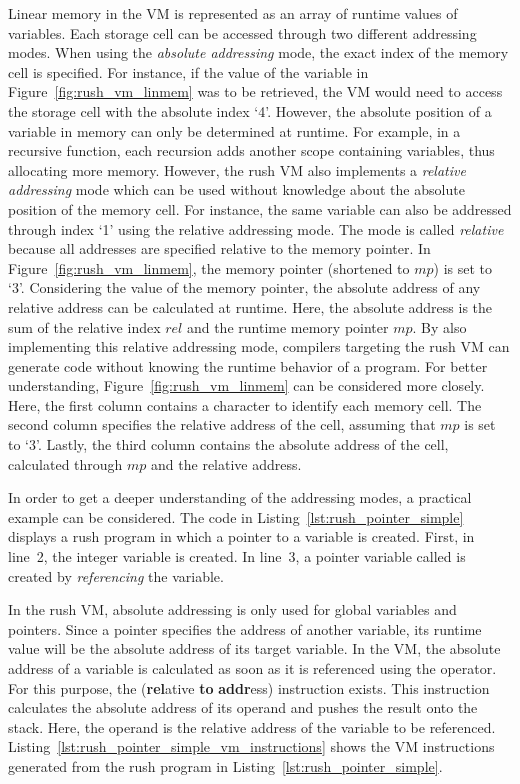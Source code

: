 Linear memory in the VM is represented as an array of runtime values of variables.
Each storage cell can be accessed through two different addressing modes.
When using the \emph{absolute addressing} mode, the exact index of the memory cell is specified.
For instance, if the value of the variable  in Figure~\ref{fig:rush_vm_linmem} was to be retrieved,
the VM would need to access the storage cell with the absolute index `4'.
However, the absolute position of a variable in memory can only be determined at runtime.
For example, in a recursive function, each recursion adds another scope containing variables, thus allocating more memory.
However, the rush VM also implements a \emph{relative addressing} mode which can be used without knowledge about the absolute position of the memory cell.
For instance, the same variable can also be addressed through index `1' using the relative addressing mode.
The mode is called \emph{relative} because all addresses are specified relative to the memory pointer.
In Figure~\ref{fig:rush_vm_linmem}, the memory pointer (shortened to $mp$) is set to `3'.
Considering the value of the memory pointer, the absolute address of any relative address can be calculated at runtime.
Here, the absolute address is the sum of the relative index $rel$ and the runtime memory pointer $mp$.
By also implementing this relative addressing mode,
compilers targeting the rush VM can generate code without knowing the runtime behavior of a program.
For better understanding, Figure~\ref{fig:rush_vm_linmem} can be considered more closely.
Here, the first column contains a character to identify each memory cell.
The second column specifies the relative address of the cell, assuming that $mp$ is set to `3'.
Lastly, the third column contains the absolute address of the cell, calculated through $mp$ and the relative address.


In order to get a deeper understanding of the addressing modes, a practical example can be considered.
The code in Listing~\ref{lst:rush_pointer_simple} displays a rush program in which a pointer to a variable is created.
First, in line~2, the integer variable  is created.
In line~3, a pointer variable called  is created by \emph{referencing} the  variable.

In the rush VM, absolute addressing is only used for global variables and pointers.
Since a pointer specifies the address of another variable, its runtime value will be the absolute address of its target variable.
In the VM, the absolute address of a variable is calculated as soon as it is referenced using the \qVerb{&} operator.
For this purpose, the  (\textbf{rel}ative \textbf{to} \textbf{addr}ess) instruction exists.
This instruction calculates the absolute address of its operand and pushes the result onto the stack.
Here, the operand is the relative address of the variable to be referenced.
Listing~\ref{lst:rush_pointer_simple_vm_instructions} shows the VM instructions generated from the rush program in Listing~\ref{lst:rush_pointer_simple}.


